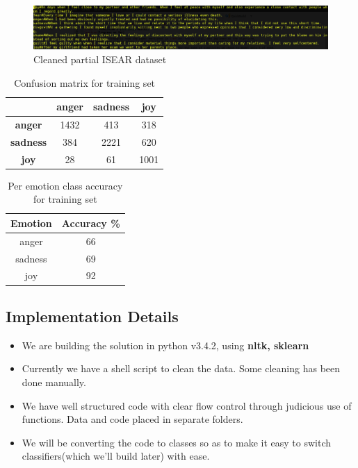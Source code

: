 \begin{center}
	\begin{figure}[ht!]
	\label{fig-clean-dataset}	
	\includegraphics[width=18cm,scale=0.5]{data.png}
	\caption{Cleaned partial ISEAR dataset}
	\end{figure}
\end{center}	
\vspace*{-1cm}
\begin{table}[ht!]
  \centering
  \label{tab-confusion}
  \begin{tabular}{c|c|c|c}
  & \textbf{anger} & \textbf{sadness} & \textbf{joy}\\
  \hline
  \textbf{anger} & 1432 & 413 & 318 \\
  \textbf{sadness} & 384 & 2221 & 620 \\
  \textbf{joy} & 28 & 61 & 1001 \\
  \end{tabular}
  \caption{Confusion matrix for training set}
\end{table}
\vspace*{-0.5cm}
\begin{table}[ht!]
  \centering
  \label{tab-accuracy}
  \begin{tabular}{c|c}
  \textbf{Emotion} & \textbf{Accuracy \%} \\
  \hline
  anger & 66 \\
  sadness & 69 \\
  joy & 92
  \end{tabular}
  \caption{Per emotion class accuracy for training set}
\end{table}
\subsection{Implementation Details}
\begin{itemize}
 \item We are building the solution in python v3.4.2, using \textbf{nltk, sklearn}
 \item Currently we have a shell script to clean the data. Some cleaning has been done manually.
 \item We have well structured code with clear flow control through judicious use of functions. Data and code placed in separate folders.
 \item We will be converting the code to classes so as to make it easy to switch classifiers(which we'll build later) with ease.
\end{itemize}
